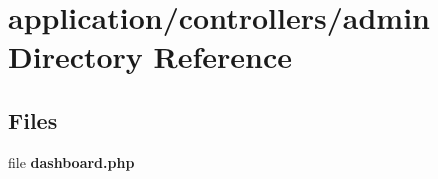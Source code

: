 \section{application/controllers/admin Directory Reference}
\label{dir_95ac41ebb61cd70e7104f61ab6f59e4c}
\subsection*{Files}
\begin{DoxyCompactItemize}
\item 
file {\bf dashboard.\-php}
\end{DoxyCompactItemize}
